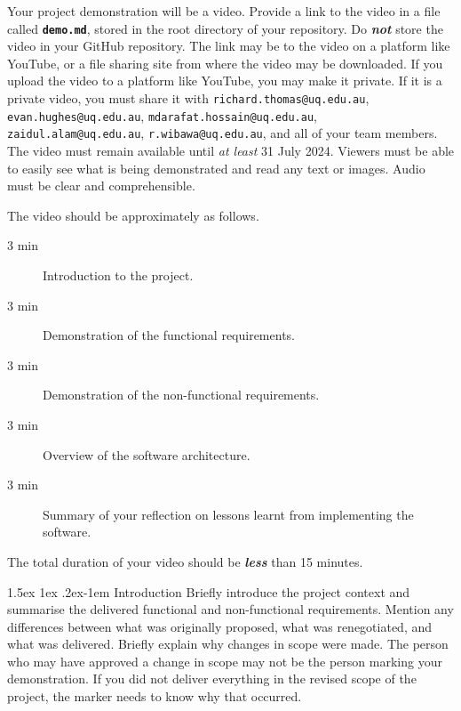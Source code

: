 \documentclass{csse4400}
\makeatletter
\renewcommand{\paragraph}{%
  \@startsection{paragraph}{4}%
  {\z@}{1.5ex \@plus 1ex \@minus .2ex}{-1em}%
  {\normalfont\normalsize\bfseries}%
}
\makeatother
\begin{document}
Your project demonstration will be a video.
Provide a link to the video in a file called \textbf{\texttt{demo.md}}, stored in the root directory of your repository.
Do \textbf{\textit{not}} store the video in your GitHub repository.
The link may be to the video on a platform like YouTube, or a file sharing site from where the video may be downloaded.
If you upload the video to a platform like YouTube, you may make it private.
If it is a private video, you must share it with \texttt{richard.thomas@uq.edu.au},
\texttt{evan.hughes@uq.edu.au}, \texttt{mdarafat.hossain@uq.edu.au}, \\\texttt{zaidul.alam@uq.edu.au},
\texttt{r.wibawa@uq.edu.au}, and all of your team members.
The video must remain available until \textit{at least} 31 July 2024.
Viewers must be able to easily see what is being demonstrated and read any text or images.
Audio must be clear and comprehensible.

\begin{samepage}
The video  should be approximately as follows.

\begin{description}
    \item[3 min] Introduction to the project.
    \item[3 min] Demonstration of the functional requirements.
    \item[3 min] Demonstration of the non-functional requirements.
    \item[3 min] Overview of the software architecture.
    \item[3 min] Summary of your reflection on lessons learnt from implementing the software.
\end{description}
\end{samepage}

\noindent
The total duration of your video should be \textbf{\emph{less}} than 15 minutes.

\paragraph{Introduction} Briefly introduce the project context and summarise the delivered functional and non-functional requirements.
Mention any differences between what was originally proposed, what was renegotiated, and what was delivered.
Briefly explain why changes in scope were made.
The person who may have approved a change in scope may not be the person marking your demonstration.
If you did not deliver everything in the revised scope of the project, the marker needs to know why that occurred.
\end{document}
